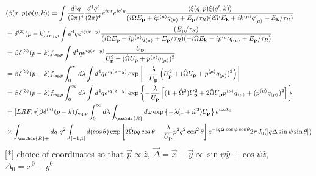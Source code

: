 \documentclass[aps,prd,preprint,nofootinbib,amsmath,amssymb,showpacs,longbibliography,singlecolumn,superscriptaddress,10pt]{revtex4-1}
\theoremstyle{plain}
\theoremstyle{definition}
\begin{document}
\begin{equation}
\begin{aligned}
&
\langle \phi(x,p) \phi(y,k)  \rangle 
=
\int \frac{d^{4}q}{(2 \pi)^{4}}  \frac{d^{4}q'}{(2 \pi)^{4}} e^{iqx} e^{iq'y} \frac{\langle \xi(q,p) \xi(q',k)  \rangle }{(i \Omega E_{\bf p} + i p^{\langle \mu \rangle} q_{\langle \mu \rangle} + E_{\bf p}/\tau_{R})(i \Omega' E_{\bf k} + i k^{\langle \mu \rangle} q'_{\langle \mu \rangle} + E_{\bf k}/\tau_{R}) } 
\\
&
=
\delta^{(3)}(p-k) f_{\mathrm{eq},p} \int d^{4}q  e^{iq (x-y)} \frac{(E_{\bf p}/\tau_{R})}{(i \Omega E_{\bf p} + i p^{\langle \mu \rangle} q_{\langle \mu \rangle} + E_{\bf p}/\tau_{R})(-i \Omega E_{\bf k} - i p^{\langle \mu \rangle} q_{\langle \mu \rangle} + E_{\bf p}/\tau_{R}) } 
\\
&
= 
\beta
\delta^{(3)}(p-k) f_{\mathrm{eq},p} \int d^{4}q  e^{iq (x-y)} \frac{U_{\bf p}}{U_{\bf p}^{2} + (\hat{\Omega} U_{\bf p} + p^{\langle \mu \rangle} q_{\langle \mu \rangle})^{2} } 
\\
&
=
\beta
\delta^{(3)}(p-k) f_{\mathrm{eq},p} \int_{0}^{\infty} d\lambda \int d^{4}q  e^{iq (x-y)} \exp\left[- \frac{\lambda }{U_{\bf p}} \left( U_{\bf p}^{2} + (\hat{\Omega} U_{\bf p} + p^{\langle \mu \rangle} q_{\langle \mu \rangle})^{2} \right) \right]
\\
&
=
\beta
\delta^{(3)}(p-k) f_{\mathrm{eq},p} \int_{0}^{\infty} d\lambda \int d^{4}q  e^{iq (x-y)} \exp\left\{- \frac{\lambda }{U_{\bf p}} \left[ (1 + \hat{\Omega}^{2}) U_{\bf p}^{2} + 2 \hat{\Omega} U_{\bf p} p^{\langle \mu \rangle} q_{\langle \mu \rangle} + (p^{\langle \mu \rangle} q_{\langle \mu \rangle})^{2} \right] \right\}
\\
&
= [LRF,*]
\beta
\delta^{(3)}(p-k) f_{\mathrm{eq},p} \int_{0}^{\infty} d\lambda \int_{\mathds{R}} d\omega \exp\left\{- \lambda  (1 + \hat{\omega}^{2}) U_{\bf p} \right\} e^{i \omega \Delta_{0}} 
\\
&
\times \int_{\mathds{R}+} dq \ q^{2} \int_{[-1,1]} d(\cos \theta)
\exp\left[ 2 \hat{\Omega}  p q \cos \theta - \frac{\lambda}{U_{\bf p}}  p^{2} q^{2} \cos^{2} \theta \right]
e^{-i q \Delta \cos \psi \cos \theta} 2 \pi J_{0}(|q \Delta \sin \psi \sin \theta|)
\end{aligned}    
\end{equation}
%
[*] choice of coordinates so that $\Vec{p} \propto \hat{z}$, $\Vec{\Delta} = \Vec{x} - \Vec{y} \propto \sin \psi \hat{y} + \cos \psi \hat{z}$, $\Delta_{0} = x^{0} - y^{0}$
\end{document}
